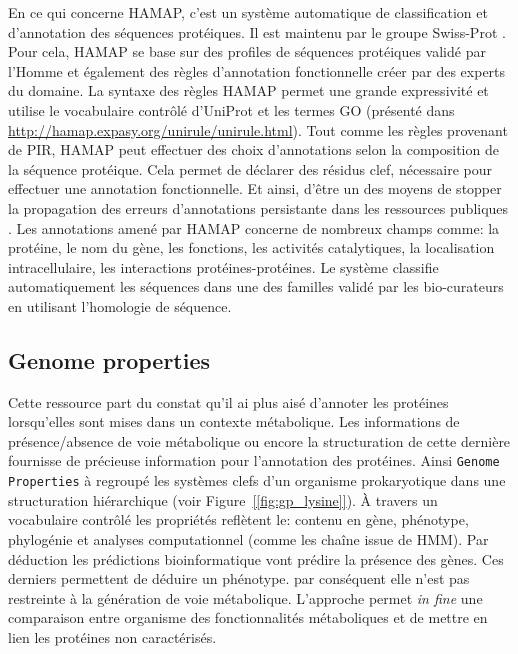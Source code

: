 \begin{refsegment}
    En ce qui concerne \acrfull{HAMAP}, c'est un système automatique de classification et d'annotation des séquences protéiques. Il est maintenu par le groupe Swiss-Prot . Pour cela, \acrfull{HAMAP} se base sur des profiles de séquences protéiques validé par l'Homme et également des règles d'annotation fonctionnelle créer par des experts du domaine. La syntaxe des règles  \acrfull{HAMAP} permet une grande expressivité et utilise le vocabulaire contrôlé d'UniProt et les termes \acrfull{GO} (présenté dans \url{http://hamap.expasy.org/unirule/unirule.html}). Tout comme les règles provenant de \acrfull{PIR}, \acrfull{HAMAP} peut effectuer des choix d'annotations selon la composition de la séquence protéique. Cela permet de déclarer des résidus clef, nécessaire pour effectuer une annotation fonctionnelle. Et ainsi, d'être un des moyens de stopper la propagation des erreurs d'annotations persistante dans les ressources publiques \cite{schnoes2009annotation,devos2001intrinsic,bell2013can,gilks2002modeling}. Les annotations amené par \acrfull{HAMAP} concerne de nombreux champs comme: la protéine, le nom du gène, les fonctions, les activités catalytiques, la localisation intracellulaire, les interactions protéines-protéines. Le système classifie automatiquement les séquences dans une des familles validé par les bio-curateurs en utilisant l'homologie de séquence.
    
    \subsection{Genome properties}
    
    Cette ressource part du constat qu'il ai plus aisé d'annoter les protéines lorsqu'elles sont mises dans un contexte métabolique. Les informations de présence/absence de voie métabolique ou encore la structuration de cette dernière fournisse de précieuse information pour l'annotation des protéines. Ainsi \texttt{Genome Properties} \cite{selengut2007tigrfams,haft2005genome,haft2013tigrfams} à regroupé les systèmes clefs d'un organisme prokaryotique dans une structuration hiérarchique (voir Figure~\cref{[fig:gp_lysine]}). À travers un vocabulaire contrôlé les propriétés reflètent le: contenu en gène, phénotype, phylogénie et analyses computationnel (comme les chaîne issue de \acrfull{HMM}). Par déduction les prédictions bioinformatique vont prédire la présence des gènes. Ces derniers permettent de déduire un phénotype. par conséquent elle n'est pas restreinte à la génération de voie métabolique. L'approche permet \textit{in fine} une comparaison entre organisme des fonctionnalités métaboliques et de mettre en lien les protéines non caractérisés.
    

\end{refsegment}
